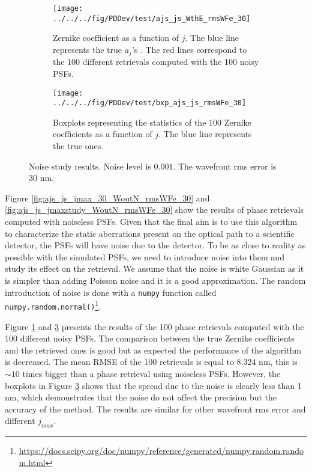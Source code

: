 \begin{figure}
\centering
    \begin{subfigure}{0.45\textwidth}
        \texttt{[image: ../../../fig/PDDev/test/ajs\_js\_WthE\_rmsWFe\_30]}
        \caption{Zernike coefficient as a function of $j$.  The blue line represents the true $a_j$'s . The red lines correspond to the 100 different retrievals computed with the 100 noisy PSFs.}
        \label{subfig:ajs_js_WthE_rmsWFe_30}
    \end{subfigure}
    \quad
    \begin{subfigure}{0.45\textwidth}
        \texttt{[image: ../../../fig/PDDev/test/bxp\_ajs\_js\_rmsWFe\_30]}
        \caption{Boxplots representing the statistics of the 100 Zernike coefficients as a function of $j$. The blue line represents the true ones.}
        \label{subfig:bxp_ajs_js_rmsWFe_30}
    \end{subfigure}
    \decoRule
    \caption{Noise study results. Noise level is $0.001$. The wavefront rms error is 30 nm.}
\end{figure}

Figure \ref{fig:ajs_js_jmax_30_WoutN_rmsWFe_30} and \ref{fig:ajs_js_jmaxstudy_WoutN_rmsWFe_30} show the results of phase retrievals computed with noiseless PSFs. Given that the final aim is to use this algorithm to characterize the static aberrations present on the optical path to a scientific detector, the PSFs will have noise due to the detector. To be as close to reality as possible with the simulated PSFs, we need to introduce noise into them and study its effect on the retrieval. We assume that the noise is white Gaussian as it is simpler than adding Poisson noise and it is a good approximation. The random introduction of noise is done with a \verb!numpy! function called \verb!numpy.random.normal()!\footnote{\url{https://docs.scipy.org/doc/numpy/reference/generated/numpy.random.random.html}}.

Figure \ref{subfig:ajs_js_WthE_rmsWFe_30} and \ref{subfig:bxp_ajs_js_rmsWFe_30} presents the results of the 100 phase retrievals computed with the 100 different noisy PSFs. The comparison between the true Zernike coefficients and the retrieved ones is good but as expected the performance of the algorithm is decreased. The mean RMSE of the 100 retrievals is equal to 8.324 nm, this is $\sim10$ times bigger than a phase retrieval using noiseless PSFs. However, the boxplots in Figure \ref{subfig:bxp_ajs_js_rmsWFe_30} shows that the spread due to the noise is clearly less than 1 nm, which demonstrates that the noise do not affect the precision but the accuracy of the method. The results are similar for other wavefront rms error and different $j_{max}$.

